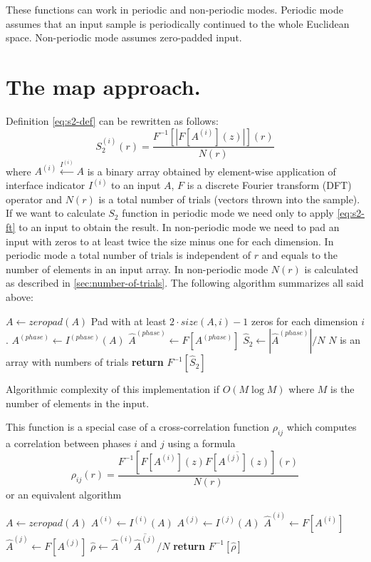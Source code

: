 \documentclass[reprint,amsmath,amssymb,aps,pre,showkeys,showpacs,nofootinbib]{revtex4-1}
\begin{document}
These functions can work in periodic and non-periodic modes. Periodic mode
assumes that an input sample is periodically continued to the whole Euclidean
space. Non-periodic mode assumes zero-padded input.

\section{The map approach.}
\label{sec:map}
Definition \cref{eq:s2-def} can be rewritten as follows:
\begin{equation}
  S_2^{(i)}(r) = \frac{F^{-1} [|F [A^{(i)}](z)|] (r)}{N(r)} \label{eq:s2-ft}
\end{equation}
where $A^{(i)} \xleftarrow{I^{(i)}} A$ is a binary array obtained by element-wise
application of interface indicator $I^{(i)}$ to an input $A$, $F$ is a discrete
Fourier transform (DFT) operator and $N(r)$ is a total number of trials (vectors
thrown into the sample). If we want to calculate $S_2$ function in periodic mode
we need only to apply \cref{eq:s2-ft} to an input to obtain the result. In
non-periodic mode we need to pad an input with zeros to at least twice the size
minus one for each dimension. In periodic mode a total number of trials is
independent of $r$ and equals to the number of elements in an input array. In
non-periodic mode $N(r)$ is calculated as described in
\cref{sec:number-of-trials}. The following algorithm summarizes all said above:
\begin{algorithmic}[1]
  \State $A \gets zeropad(A)$
  \Comment Pad with at least $2\cdot size(A, i) - 1$ zeros for each dimension $i$.
  \EndIf
  \State $A^{(phase)} \gets I^{(phase)} (A)$
  \State $\hat{A}^{(phase)} \gets F[A^{(phase)}]$
  \State $\hat{S}_2 \gets |\hat{A}^{(phase)}| / N$
  \Comment $N$ is an array with numbers of trials
  \State \textbf{return} $F^{-1} [\hat{S}_2]$
  \EndProcedure
\end{algorithmic}
Algorithmic complexity of this implementation if $O(M \log M)$ where $M$ is the
number of elements in the input.

This function is a special case of a cross-correlation function $\rho_{ij}$
which computes a correlation between phases $i$ and $j$ using a formula
\begin{equation}
  \rho_{ij}(r) = \frac{F^{-1} [F[A^{(i)}](z) \overline{F[A^{(j)}](z)}] (r)}{N(r)} \label{eq:cross-ft}
\end{equation}
or an equivalent algorithm
\begin{algorithmic}[1]
    \State $A \gets zeropad(A)$
  \EndIf
  \State $A^{(i)} \gets I^{(i)} (A)$
  \State $A^{(j)} \gets I^{(j)} (A)$
  \State $\hat{A}^{(i)} \gets F[A^{(i)}]$
  \State $\hat{A}^{(j)} \gets F[A^{(j)}]$
  \State $\hat{\rho} \gets \hat{A}^{(i)} \overline{\hat{A}^{(j)}} / N$
  \State \textbf{return} $F^{-1} [\hat{\rho}]$
  \EndProcedure
\end{algorithmic}
\end{document}

